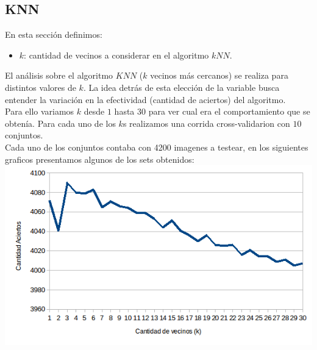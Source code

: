 \subsection{KNN}
En esta sección definimos:
\begin{itemize}
	\item $k$: cantidad de vecinos a considerar en el algoritmo $kNN$.
\end{itemize}
El análisis sobre el algoritmo $KNN$ ($k$ vecinos más cercanos) se realiza para distintos valores de $k$. La idea detrás de esta elección de la variable busca entender la variación en la efectividad (cantidad de aciertos) del algoritmo.
\\
Para ello variamos $k$ desde $1$ hasta $30$ para ver cual era el comportamiento que se obtenía. Para cada uno de los $k$s realizamos una corrida cross-validarion con $10$ conjuntos.
\\
Cada uno de los conjuntos contaba con 4200 imagenes a testear, en los siguientes graficos presentamos algunos de los sets obtenidos:
\\
\includegraphics[scale=0.55]{nuevosResultados/knn/1.png}\\

